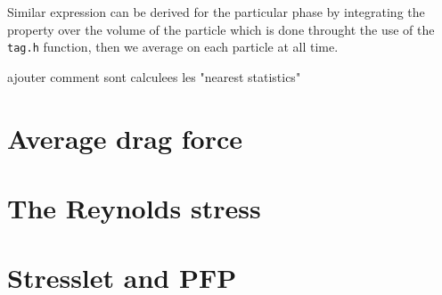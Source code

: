 \documentclass[12pt]{My_preprint}
\newcommand{\JL}[1]{\color{red}#1\color{black}}
\begin{document}
Similar expression can be derived for the particular phase by integrating the property over the volume of the particle which is done throught the use of the \texttt{tag.h} function, then we average on each particle at all time.

\JL{ajouter comment sont calculees les "nearest statistics"}





\section{Average drag force}



\section{The Reynolds stress}





%

\section{Stresslet and PFP}
 
 

\end{document}
